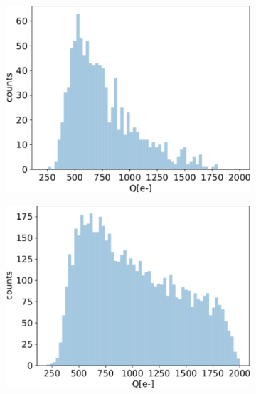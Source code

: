   \begin{figure}
       \centering
       \begin{subfigure}[b]{0.49\textwidth}
           \centering
           \includegraphics[width=\linewidth]{figures/test_beam/Q1_17_11.pdf}        
           \caption{}
           \label{fig:sa}
       \end{subfigure}
       \hfill
       \begin{subfigure}[b]{0.49\textwidth}
           \centering
           \includegraphics[width=\linewidth]{figures/test_beam/Q2_17_11.pdf}
           \caption{}
           \label{fig:sb}
       \end{subfigure}\\

\end{figure}
